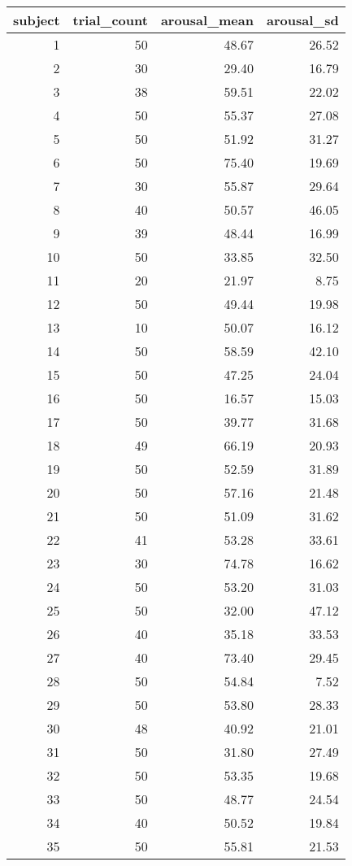 \documentclass{standalone}
\begin{document}
\begin{tabular}{r|r|r|r}
\hline
subject & trial\_count & arousal\_mean & arousal\_sd\\
\hline
1 & 50 & 48.67 & 26.52\\
\hline
2 & 30 & 29.40 & 16.79\\
\hline
3 & 38 & 59.51 & 22.02\\
\hline
4 & 50 & 55.37 & 27.08\\
\hline
5 & 50 & 51.92 & 31.27\\
\hline
6 & 50 & 75.40 & 19.69\\
\hline
7 & 30 & 55.87 & 29.64\\
\hline
8 & 40 & 50.57 & 46.05\\
\hline
9 & 39 & 48.44 & 16.99\\
\hline
10 & 50 & 33.85 & 32.50\\
\hline
11 & 20 & 21.97 & 8.75\\
\hline
12 & 50 & 49.44 & 19.98\\
\hline
13 & 10 & 50.07 & 16.12\\
\hline
14 & 50 & 58.59 & 42.10\\
\hline
15 & 50 & 47.25 & 24.04\\
\hline
16 & 50 & 16.57 & 15.03\\
\hline
17 & 50 & 39.77 & 31.68\\
\hline
18 & 49 & 66.19 & 20.93\\
\hline
19 & 50 & 52.59 & 31.89\\
\hline
20 & 50 & 57.16 & 21.48\\
\hline
21 & 50 & 51.09 & 31.62\\
\hline
22 & 41 & 53.28 & 33.61\\
\hline
23 & 30 & 74.78 & 16.62\\
\hline
24 & 50 & 53.20 & 31.03\\
\hline
25 & 50 & 32.00 & 47.12\\
\hline
26 & 40 & 35.18 & 33.53\\
\hline
27 & 40 & 73.40 & 29.45\\
\hline
28 & 50 & 54.84 & 7.52\\
\hline
29 & 50 & 53.80 & 28.33\\
\hline
30 & 48 & 40.92 & 21.01\\
\hline
31 & 50 & 31.80 & 27.49\\
\hline
32 & 50 & 53.35 & 19.68\\
\hline
33 & 50 & 48.77 & 24.54\\
\hline
34 & 40 & 50.52 & 19.84\\
\hline
35 & 50 & 55.81 & 21.53\\
\hline
\end{tabular}
\end{document}
